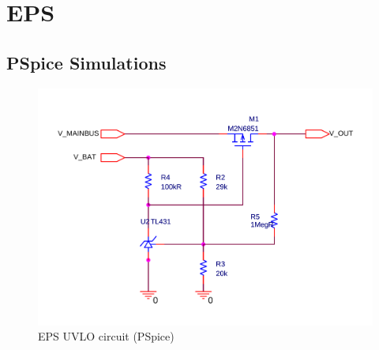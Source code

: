 \appendix

\chapter{EPS}\label{app:EPS}
%
\section{PSpice Simulations}
\label{app:EPS_PSpice}
%
%
\begin{figure}[H]
\centering
\includegraphics[scale=0.4]{figures/fig_CDR_PSpice_UVLO}
\caption{EPS UVLO circuit (PSpice)}
\label{fig:PSpice_UVLO}
\end{figure}

